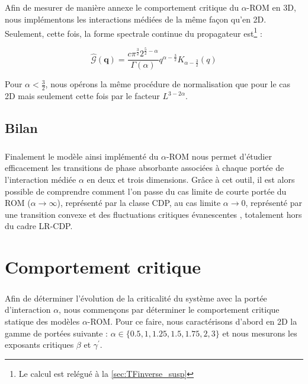 \subparagraph{}Afin de mesurer de manière annexe le comportement critique du $\alpha$-ROM en 3D, nous implémentons les interactions médiées de la même façon qu'en 2D. Seulement, cette fois, la forme spectrale continue du propagateur est\footnote{Le calcul est relégué à la \autoref{sec:TFinverse_susp}} :


\begin{equation}
	\hat{\mathcal{G}}(\mathbf{q}) = \frac{c\pi^\frac{3}{2}2^{\frac{5}{2}-\alpha}}{\Gamma (\alpha)}q^{\alpha-\frac{3}{2}}K_{\alpha-\frac{3}{2}}(q)
\end{equation}

\noindent Pour $\alpha < \frac{3}{2}$, nous opérons la même procédure de normalisation que pour le cas 2D mais seulement cette fois par le facteur $L^{3-2\alpha}$.

\subsection*{Bilan}

\subparagraph{}Finalement le modèle ainsi implémenté du $\alpha$-ROM nous permet d'étudier efficacement les transitions de phase absorbante associées à chaque portée de l'interaction médiée $\alpha$ en deux et trois dimensions. Grâce à cet outil, il est alors possible de comprendre comment l'on passe du cas limite de courte portée du ROM ($\alpha\rightarrow\infty$), représenté par la classe CDP, au cas limite $\alpha \rightarrow 0$, représenté par une transition convexe et des fluctuations critiques évanescentes \cite{mari_absorbing_2022}, totalement hors du cadre LR-CDP.

\section{Comportement critique}

\subparagraph{}Afin de déterminer l'évolution de la criticalité du système avec la portée d'interaction $\alpha$, nous commençons par déterminer le comportement critique statique des modèles $\alpha$-ROM. Pour ce faire, nous caractérisons d'abord en 2D la gamme de portées suivante : $\alpha \in \{ 0.5, 1, 1.25, 1.5, 1.75, 2, 3 \}$ et nous mesurons les exposants critiques $\beta$ et $\gamma^\prime$. 

